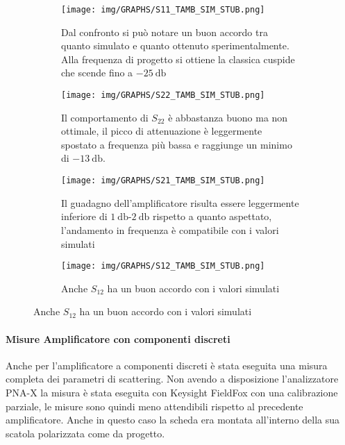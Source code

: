 \documentclass[12pt,oneside]{book}
\begin{document}
\begin{figure}[!htbp]
    \centering
    \begin{subfigure}[t]{0.48\textwidth}
        \centering
        \texttt{[image: img/GRAPHS/S11\_TAMB\_SIM\_STUB.png]}
        \caption{Dal confronto si può notare un buon accordo tra quanto simulato e quanto ottenuto sperimentalmente. Alla frequenza di progetto si ottiene la classica cuspide che scende fino a $\SI{-25}{\decibel}$}
    \end{subfigure}
    \hfill
    \begin{subfigure}[t]{0.48\textwidth}
        \centering
        \texttt{[image: img/GRAPHS/S22\_TAMB\_SIM\_STUB.png]}
        \caption{Il comportamento di $S_{22}$ è abbastanza buono ma non ottimale, il picco di attenuazione è leggermente spostato a frequenza più bassa e raggiunge un minimo di $\SI{-13}{\decibel}$.}
    \end{subfigure}
    \hfill
    \centering
    \begin{subfigure}[t]{0.48\textwidth}
        \centering
        \texttt{[image: img/GRAPHS/S21\_TAMB\_SIM\_STUB.png]}
        \caption{Il guadagno dell'amplificatore risulta essere leggermente inferiore di $\SI{1}{\decibel}$-$\SI{2}{\decibel}$ rispetto a quanto aspettato, l'andamento in frequenza è compatibile con i valori simulati}
    \end{subfigure}
    \hfill
    \begin{subfigure}[t]{0.48\textwidth}
        \centering
        \texttt{[image: img/GRAPHS/S12\_TAMB\_SIM\_STUB.png]}
        \caption{Anche $S_{12}$ ha un buon accordo con i valori simulati}
    \end{subfigure}
    \hfill
\end{figure}

\paragraph{Misure Amplificatore con componenti discreti}

Anche per l'amplificatore a componenti discreti è stata eseguita una misura completa dei parametri di scattering. Non avendo a disposizione l'analizzatore PNA-X la misura è stata eseguita con Keysight FieldFox con una calibrazione parziale, le misure sono quindi meno attendibili rispetto al precedente amplificatore. Anche in questo caso la scheda era montata all'interno della sua scatola polarizzata come da progetto.
\end{document}

